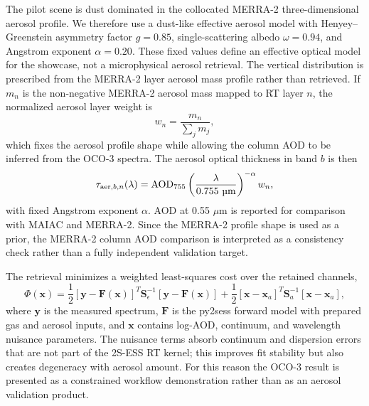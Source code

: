 \documentclass[gmd, manuscript]{copernicus}
\begin{document}
The pilot scene is dust dominated in the collocated MERRA-2 three-dimensional aerosol
profile.  We therefore use a dust-like effective aerosol model with Henyey--Greenstein
asymmetry factor $g=0.85$, single-scattering albedo $\omega=0.94$, and Angstrom
exponent $\alpha=0.20$.  These fixed values define an effective optical model for the
showcase, not a microphysical aerosol retrieval.  The vertical distribution is
prescribed from the MERRA-2 layer aerosol mass profile rather than retrieved.  If
$m_n$ is the non-negative
MERRA-2 aerosol mass mapped to RT layer $n$, the normalized aerosol layer weight is
\begin{equation}
  w_n
  =
  \frac{m_n}{\sum_j m_j},
  \label{eq:oco_aerosol_profile}
\end{equation}
which fixes the aerosol profile shape while allowing the column AOD to be inferred
from the OCO-3 spectra.  The aerosol optical thickness in band $b$ is then
\begin{equation}
  \tau_{{\rm aer},b,n}(\lambda)
  =
  {\rm AOD}_{755}
  \left(\frac{\lambda}{0.755~\mu{\rm m}}\right)^{-\alpha}
  w_n ,
  \label{eq:oco_aerosol_tau}
\end{equation}
with fixed Angstrom exponent $\alpha$.  AOD at 0.55 $\mu$m is reported for comparison
with MAIAC and MERRA-2.  Since the MERRA-2 profile shape is used as a prior, the
MERRA-2 column AOD comparison is interpreted as a consistency check rather than a
fully independent validation target.

The retrieval minimizes a weighted least-squares cost over the retained channels,
\begin{equation}
  \Phi(\mathbf{x})
  =
  \frac{1}{2}
  \left[\mathbf{y}-\mathbf{F}(\mathbf{x})\right]^T
  \mathbf{S}_{\epsilon}^{-1}
  \left[\mathbf{y}-\mathbf{F}(\mathbf{x})\right]
  +
  \frac{1}{2}
  \left[\mathbf{x}-\mathbf{x}_{a}\right]^T
  \mathbf{S}_{a}^{-1}
  \left[\mathbf{x}-\mathbf{x}_{a}\right],
  \label{eq:oco_cost}
\end{equation}
where $\mathbf{y}$ is the measured spectrum, $\mathbf{F}$ is the py2sess forward model
with prepared gas and aerosol inputs, and $\mathbf{x}$ contains log-AOD, continuum, and
wavelength nuisance parameters.  The nuisance terms absorb continuum and dispersion
errors that are not part of the 2S-ESS RT kernel; this improves fit stability but also
creates degeneracy with aerosol amount.  For this reason the OCO-3 result is presented
as a constrained workflow demonstration rather than as an aerosol validation product.
\end{document}
